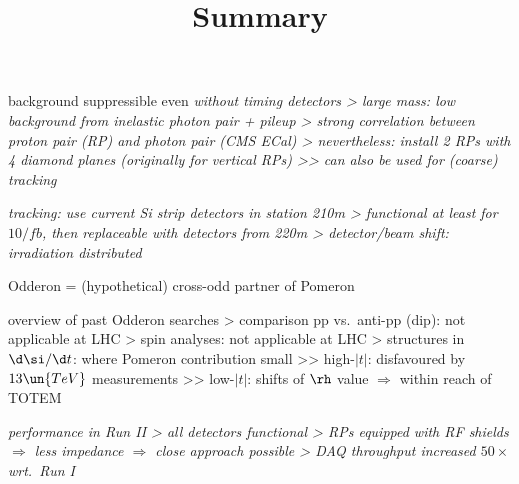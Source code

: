
\vskip-5mm

\> background suppressible even \em{without timing} detectors
\>> large mass: low background from inelastic photon pair + pileup
\>> strong correlation between proton pair (RP) and photon pair (CMS ECal)
\>> nevertheless: install 2 RPs with 4 diamond planes (originally for vertical RPs)
\>>> can also be used for (coarse) tracking

\> \em{tracking: use current Si strip} detectors in station 210m
\>> functional at least for $10/fb$, then replaceable with detectors from 220m
\>> detector/beam shift: irradiation distributed


\newpage %

\> Odderon = (hypothetical) cross-odd partner of Pomeron

\> overview of past Odderon searches
\>> comparison pp vs.~anti-pp (dip): not applicable at LHC
\>> spin analyses: not applicable at LHC
\>> structures in $\d\si / \d t$: where Pomeron contribution small
\>>> high-$|t|$: disfavoured by $13\un{TeV}$ measurements
\>>> low-$|t|$: shifts of $\rh$ value $\Rightarrow$ within reach of TOTEM




\newpage %
\title{Summary}

\> \em{performance} in Run II
\>> all detectors functional
\>> RPs equipped with RF shields $\Rightarrow$ less impedance $\Rightarrow$ close approach possible
\>> DAQ throughput increased $50\times$ wrt.~Run I

